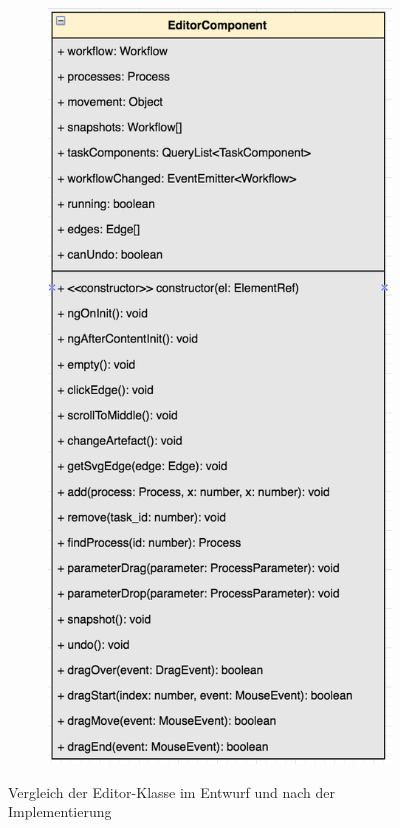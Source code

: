 \documentclass[11pt, usepdftitle=false,...]{beamer}
\begin{document}
\begin{frame}
\begin{figure}[h]
\begin{subfigure}{0.3\textwidth}
                    \includegraphics[width=0.9\linewidth]{images/editor-2.png}
                \end{subfigure}
                \caption{Vergleich der Editor-Klasse im Entwurf und nach der Implementierung}
                \label{fig:compateEditor}
            \end{figure}
            
    	\end{frame}
    	
\end{document}
